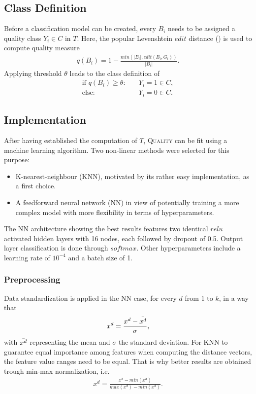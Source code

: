 \documentclass{jdmdh}
\begin{document}
\subsection{Class Definition}
Before a classification model can be created, every $B_i$ needs to be assigned a quality class $Y_i\!\in\!C$ in $T$. Here, the popular Levenshtein $edit$ distance (\citet{levenshtein}) is used to compute quality measure
\begin{align}
    q(B_i)=1-\frac{min(|B_i|, edit(B_i, G_i))}{|B_i|}. \label{formula:quality}
\end{align}
Applying threshold $\theta$ leads to the class definition of
\begin{align}
    \text{if }q(B_i)\geq\theta:&\quad Y_i\!=\!1\!\in\!C, \nonumber \\
    \text{else}:&\quad Y_i\!=\!0\!\in\!C.
\end{align}
\subsection{Implementation} \label{section:implementation}
After having established the computation of $T$, \textsc{Quality} can be fit using a machine learning algorithm. Two non-linear methods were selected for this purpose: \\
\begin{itemize}
    \item K-nearest-neighbour (\textsc{KNN}), motivated by its rather easy implementation, as a first choice.
    \item A feedforward neural network (\textsc{NN}) in view of potentially training a more complex model with more flexibility in terms of hyperparameters. \\
\end{itemize}
The \textsc{NN} architecture showing the best results features two identical $relu$ activated hidden layers with 16 nodes, each followed by dropout of 0.5. Output layer classification is done through $softmax$. Other hyperparameters include a learning rate of $10^{-4}$ and a batch size of 1.
\subsubsection{Preprocessing}
Data standardization is applied in the \textsc{NN} case, for every $d$ from $1$ to $k$, in a way that
\begin{align}
    x^d = \frac{x^d-\Bar{x^d}}{\sigma},
\end{align}
with $\Bar{x^d}$ representing the mean and $\sigma$ the standard deviation. For \textsc{KNN} to guarantee equal importance among features when computing the distance vectors, the feature value ranges need to be equal. That is why better results are obtained trough min-max normalization, i.e.
\begin{align}
    x^d = \frac{x^d-min(x^d)}{max(x^d)-min(x^d)}.
\end{align}
\end{document}
